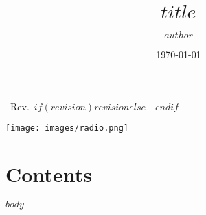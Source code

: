 \documentclass[11pt]{report}
\author{$author$}
\title{$title$}
\date{\today}
\makeatletter
\let\Oldsection\section
\renewcommand{\section}{\FloatBarrier\Oldsection}
\let\thetitle\@title
\def \currentrevision{$if(revision)$$revision$$else$ - $endif$}
\makeatother
\begin{document}
\pagestyle{TitlePages}

\begin{center}
    {\LARGE \thetitle}

    \vspace{0.3cm}

    {\Large ~Rev.~\currentrevision}

    \vspace{1cm}
\end{center}

\vspace{6cm}

\texttt{[image: images/radio.png]}

\newpage

\pagestyle{General}

\section{Contents}

\doublespacing
\tableofcontents
\singlespacing

\newpage


$body$


\end{document}
